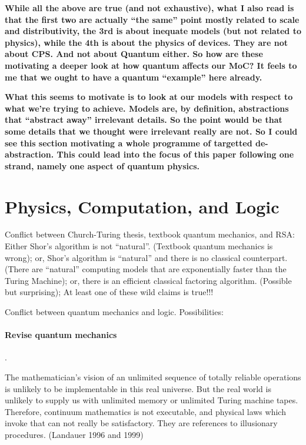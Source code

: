 \documentclass[12pt]{article}
\newcommand{\jc}[1]{\fbox{Jacques says:} \textbf{#1}}
\begin{document}
\jc{While all the above are true (and not exhaustive), what I also read
is that the first two are actually ``the same'' point mostly related
to scale and distributivity, the 3rd is about inequate models (but not 
related to physics), while the 4th is about the physics of devices.
They are not about CPS. And not about Quantum either. So how are these
motivating a deeper look at how quantum affects our MoC? It feels to me
that we ought to have a quantum ``example'' here already.}

\jc{What this seems to motivate is to look at our models with respect
to what we're trying to achieve.  Models are, by definition, abstractions
that ``abstract away'' irrelevant details. So the point would be that
some details that we thought were irrelevant really are not.
So I could see this section motivating a whole programme of
targetted de-abstraction. This could lead into the focus of this paper
following one strand, namely one aspect of quantum physics.}

\section{Physics, Computation, and Logic}

Conflict between Church-Turing thesis, textbook quantum mechanics, and
RSA: Either Shor’s algorithm is not ``natural''. (Textbook quantum
mechanics is wrong); or, Shor’s algorithm is ``natural'' and there is
no classical counterpart. (There are ``natural'' computing models that
are exponentially faster than the Turing Machine); or, there is an
efficient classical factoring algorithm. (Possible but surprising); At
least one of these wild claims is true!!!

Conflict between quantum mechanics and logic. Possibilities:

\paragraph*{Revise quantum mechanics}.

The mathematician's vision of an unlimited sequence of totally
reliable operations is unlikely to be implementable in this real
universe.  But the real world is unlikely to supply us with unlimited
memory or unlimited Turing machine tapes. Therefore, continuum
mathematics is not executable, and physical laws which invoke that can
not really be satisfactory. They are references to illusionary
procedures.  (Landauer 1996 and 1999)
\end{document}
